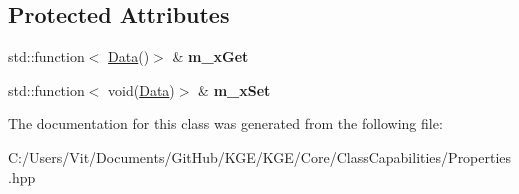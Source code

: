 \subsection*{Protected Attributes}
\begin{DoxyCompactItemize}
\item 
\hypertarget{class_k_g_e_1_1_property_data_by_callback_ac8208b2b303b7ffbf46cc30aba97d41a}{std\-::function$<$ \hyperlink{class_k_g_e_1_1_data}{Data}()$>$ \& {\bfseries m\-\_\-x\-Get}}\label{class_k_g_e_1_1_property_data_by_callback_ac8208b2b303b7ffbf46cc30aba97d41a}

\item 
\hypertarget{class_k_g_e_1_1_property_data_by_callback_ac3694eac39e19664078749e97fae4231}{std\-::function$<$ void(\hyperlink{class_k_g_e_1_1_data}{Data})$>$ \& {\bfseries m\-\_\-x\-Set}}\label{class_k_g_e_1_1_property_data_by_callback_ac3694eac39e19664078749e97fae4231}

\end{DoxyCompactItemize}


The documentation for this class was generated from the following file\-:\begin{DoxyCompactItemize}
\item 
C\-:/\-Users/\-Vit/\-Documents/\-Git\-Hub/\-K\-G\-E/\-K\-G\-E/\-Core/\-Class\-Capabilities/Properties.\-hpp\end{DoxyCompactItemize}
